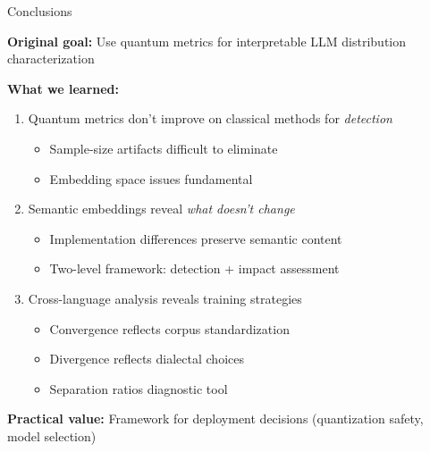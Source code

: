 \documentclass[aspectratio=169,11pt]{beamer}
\begin{document}
\begin{frame}{Conclusions}

\textbf{Original goal:} Use quantum metrics for interpretable LLM distribution characterization

\vspace{0.5em}

\textbf{What we learned:}

\begin{enumerate}
  \item Quantum metrics don't improve on classical methods for \emph{detection}
  \begin{itemize}
    \item Sample-size artifacts difficult to eliminate
    \item Embedding space issues fundamental
  \end{itemize}

  \vspace{0.5em}

  \item Semantic embeddings reveal \emph{what doesn't change}
  \begin{itemize}
    \item Implementation differences preserve semantic content
    \item Two-level framework: detection + impact assessment
  \end{itemize}

  \vspace{0.5em}

  \item Cross-language analysis reveals training strategies
  \begin{itemize}
    \item Convergence reflects corpus standardization
    \item Divergence reflects dialectal choices
    \item Separation ratios diagnostic tool
  \end{itemize}
\end{enumerate}

\vspace{0.5em}

\textbf{Practical value:} Framework for deployment decisions (quantization safety, model selection)

\end{frame}

\appendix
\end{document}
